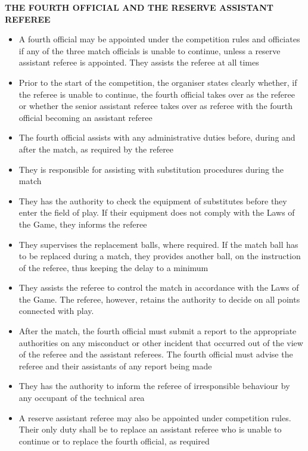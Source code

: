 \clearpage
\sffamily
{\bfseries\color[rgb]{0.4,0.4,0.4}THE FOURTH OFFICIAL AND THE RESERVE ASSISTANT REFEREE}

\bigskip

\begin{itemize}
\item A fourth official may be appointed under the competition rules and officiates if any of the three match officials is unable to continue, unless a reserve assistant referee is appointed. They assists the referee at all times
\item Prior to the start of the competition, the organiser states clearly whether, if the referee is unable to continue, the fourth official takes over as the referee or whether the senior assistant referee takes over as referee with the fourth official becoming an assistant referee
\item The fourth official assists with any administrative duties before, during and after the match, as required by the referee
\item They is responsible for assisting with substitution procedures during the match
\item They has the authority to check the equipment of substitutes before they enter the field of play. If their equipment does not comply with the Laws of the Game, they informs the referee
\item They supervises the replacement balls, where required. If the match ball has to be replaced during a match, they provides another ball, on the instruction of the referee, thus keeping the delay to a minimum
\item They assists the referee to control the match in accordance with the Laws of the Game. The referee, however, retains the authority to decide on
all points connected with play.
\item After the match, the fourth official must submit a report to the appropriate authorities on any misconduct or other incident that occurred out of the view of the referee and the assistant referees. The fourth official must advise the referee and their assistants of any report being made
\item They has the authority to inform the referee of irresponsible behaviour by any occupant of the technical area
\item A reserve assistant referee may also be appointed under competition rules. Their  only duty shall be to replace an assistant referee who is unable to continue or to replace the fourth official, as required
\end{itemize}